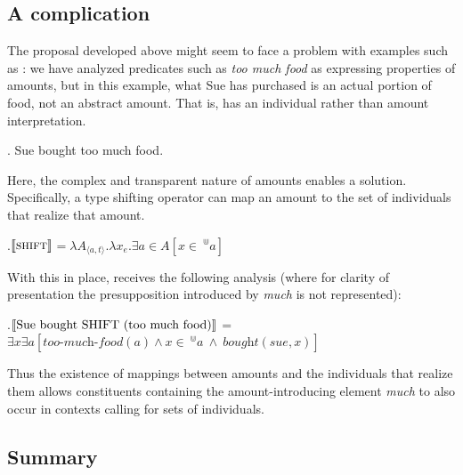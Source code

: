 \documentclass[a4paper,12pt,twoside]{article}
\newcommand{\sv}[1]{\ensuremath{\llbracket\textnormal{#1}\rrbracket}}
\begin{document}
	\subsection{A complication}
	
	The proposal developed above might seem to face a problem with examples such as \Next: we have analyzed predicates such as \textit{too much food} as expressing properties of amounts, but in this example, what Sue has purchased is an actual portion of food, not an abstract amount. That is, \Next has an individual rather than amount interpretation.
	
	\ex. Sue bought too much food.
	
	Here, the complex and transparent nature of amounts enables a solution. Specifically, a type shifting operator can map an amount to the set of individuals that realize that amount.
	
	\ex.\label{shift:a}\sv{\textsc{shift}}$=\lambda A_{\langle a,t\rangle}. \lambda x_{e} . \exists a \in  A[x \in \ ^{\Cup}a]$ 
	
	With this in place, \LLast receives the following analysis (where for clarity of presentation the presupposition introduced by \textit{much} is not represented):
	
	\ex.\label{shift:b}\sv{Sue bought SHIFT (too much food)}$=$ \\ $\exists x \exists a[\textit{too-much-food}(a) \wedge x \in \  ^{\Cup}a \ \wedge \ \textit{bought}(sue, x)]$
	
	
	
	Thus the existence of mappings between amounts and the individuals that realize them  allows constituents containing the amount-introducing element \textit{much} to also occur in contexts calling for sets of individuals.
	
	
	\subsection{Summary}\label{sec:summary}
	
\end{document}
